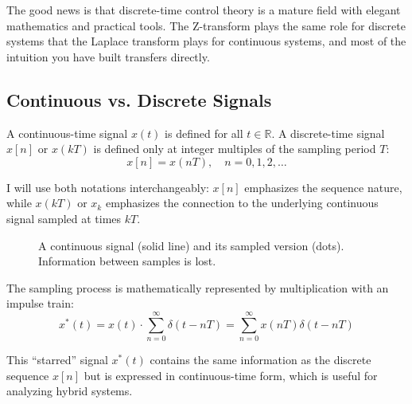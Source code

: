 The good news is that discrete-time control theory is a mature field with elegant mathematics and practical tools. The Z-transform plays the same role for discrete systems that the Laplace transform plays for continuous systems, and most of the intuition you have built transfers directly.

\subsection{Continuous vs. Discrete Signals}

A continuous-time signal $x(t)$ is defined for all $t \in \mathbb{R}$. A discrete-time signal $x[n]$ or $x(kT)$ is defined only at integer multiples of the sampling period $T$:
\begin{equation}
x[n] = x(nT), \quad n = 0, 1, 2, \ldots
\end{equation}

I will use both notations interchangeably: $x[n]$ emphasizes the sequence nature, while $x(kT)$ or $x_k$ emphasizes the connection to the underlying continuous signal sampled at times $kT$.

\begin{figure}[htbp]
\centering
{}
\caption{A continuous signal (solid line) and its sampled version (dots). Information between samples is lost.}
\label{fig:continuous_vs_discrete}
\end{figure}

The sampling process is mathematically represented by multiplication with an impulse train:
\begin{equation}
x^*(t) = x(t) \cdot \sum_{n=0}^{\infty} \delta(t - nT) = \sum_{n=0}^{\infty} x(nT) \delta(t - nT)
\end{equation}

This ``starred'' signal $x^*(t)$ contains the same information as the discrete sequence $x[n]$ but is expressed in continuous-time form, which is useful for analyzing hybrid systems.

